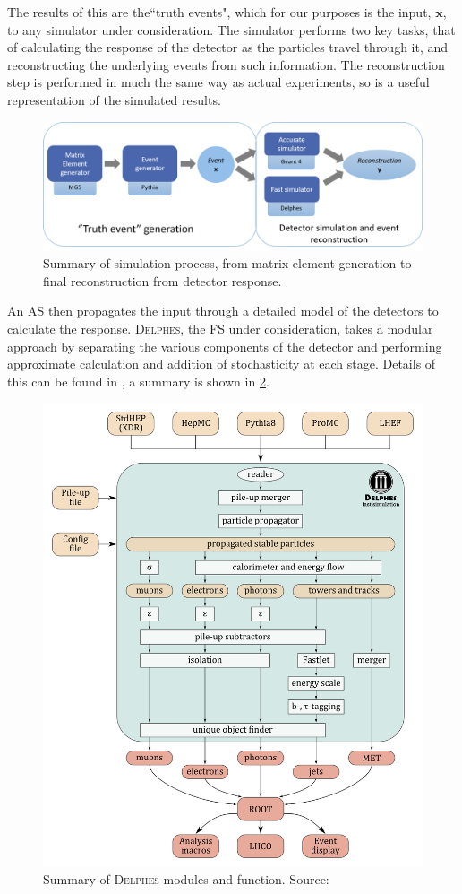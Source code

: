 \documentclass{report}
\newcommand{\pkg}[1]{\textsc{#1}}
\begin{document}
The results of this are the``truth events", which for our purposes is the input, $\mathbf{x}$, to any simulator under consideration. The simulator performs two key tasks, that of calculating the response of the detector as the particles travel through it, and reconstructing the underlying events from such information. The reconstruction step is performed in much the same way as actual experiments, so is a useful representation of the simulated results.        

\begin{figure}[H]
	\centering
	\includegraphics[width=0.8\linewidth]{simdiag}
	
	\caption{Summary of simulation process, from matrix element generation to final reconstruction from detector response.}
	\label{fig:simdiag}
	
\end{figure}	


An AS then propagates the input through a detailed model of the detectors to calculate the response. \pkg{Delphes}, the FS under consideration, takes a modular approach by separating the various components of the detector and performing approximate calculation and addition of stochasticity at each stage. Details of this can be found in \cite{delphes}, a summary is shown in \cref{fig:delphes}.  \\ 


\begin{figure}[H]
	\centering
	\includegraphics[width=0.7\linewidth]{delphes}
	
	\caption{Summary of \pkg{Delphes} modules and function. Source: \cite{delphesslid}}
	\label{fig:delphes}
	
\end{figure}
\end{document}
